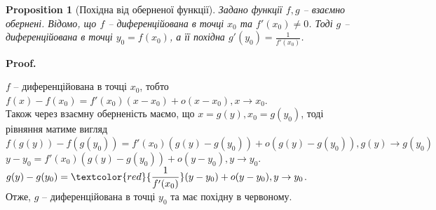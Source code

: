 \documentclass[a4paper, 14pt]{article}
\makeatletter
\def\qed{$\blacksquare$}
\theoremstyle{theoremdd}
\theoremstyle{theoremdd}
\theoremstyle{theoremdd}
\theoremstyle{theoremdd}
\theoremstyle{theoremdd}
\newtheorem{proposition}[theorem]{Proposition}
\theoremstyle{theoremdd}
\theoremstyle{theoremdd}
\theoremstyle{theoremdd}
\renewenvironment{proof}[1][Proof.\\]{\par
\pushQED{\hfill \qed}%
\normalfont \topsep6\p@\@plus6\p@\relax
\trivlist
\item\relax
{\bfseries
#1\@addpunct{.}}\hspace\labelsep\ignorespaces
}{%
\popQED\endtrivlist\@endpefalse
}
\makeatother
\begin{document}

\begin{proposition}[Похідна від оберненої функції]
Задано функції $f,g$ -- взаємно обернені. Відомо, що $f$ -- диференційована в точці $x_0$ та $f'(x_0) \neq 0$. Тоді $g$ -- диференційована в точці $y_0 = f(x_0)$, а її похідна 
$g'(y_0) = \displaystyle \frac{1}{f'(x_0)}$.
\end{proposition}

\begin{proof}
$f$ -- диференційована в точці $x_0$, тобто $f(x)-f(x_0)=f'(x_0)(x-x_0)+o(x-x_0), x \to x_0$.\\
Також через взаємну оберненість маємо, що $x = g(y), x_0 = g(y_0)$, тоді рівняння матиме вигляд\\
$f(g(y))-f(g(y_0)) = f'(x_0)(g(y)-g(y_0)) + o(g(y)-g(y_0)), g(y) \to g(y_0)$\\
$y-y_0 = f'(x_0)(g(y)-g(y_0)) + o(y-y_0), y \to y_0$.\\
$g(y)-g(y_0) = \textcolor{red}{\dfrac{1}{f'(x_0)}}(y-y_0) + o(y-y_0), y \to y_0$.\\
Отже, $g$ -- диференційована в точці $y_0$ та має похідну в червоному.
\end{proof}

\end{document}
